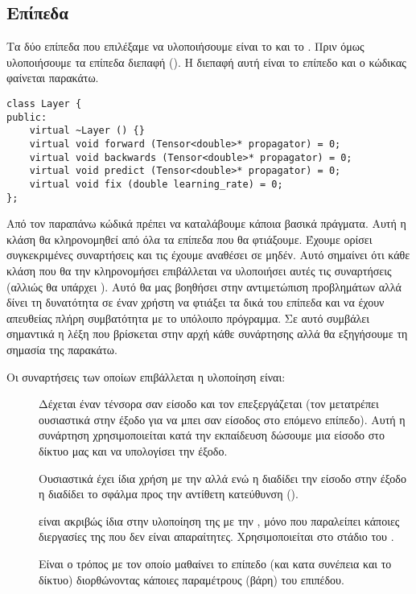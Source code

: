 \subsection{Επίπεδα}
Τα δύο επίπεδα που επιλέξαμε να υλοποιήσουμε είναι το  και το . Πριν όμως υλοποιήσουμε τα επίπεδα διεπαφή (). Η διεπαφή αυτή είναι το επίπεδο και ο κώδικας φαίνεται
παρακάτω.
\begin{otherlanguage}{english}
\begin{lstlisting}[style=cppstyle,caption=Layer Interface]
class Layer {
public:
    virtual ~Layer () {}
    virtual void forward (Tensor<double>* propagator) = 0;
    virtual void backwards (Tensor<double>* propagator) = 0;
    virtual void predict (Tensor<double>* propagator) = 0;
    virtual void fix (double learning_rate) = 0;
};
\end{lstlisting}
\end{otherlanguage}
Από τον παραπάνω κώδικά πρέπει να καταλάβουμε κάποια βασικά πράγματα. Αυτή η κλάση θα κληρονομηθεί από όλα τα επίπεδα που θα φτιάξουμε. Έχουμε ορίσει συγκεκριμένες συναρτήσεις και τις έχουμε αναθέσει σε μηδέν. Αυτό σημαίνει ότι κάθε κλάση
που θα την κληρονομήσει επιβάλλεται να υλοποιήσει αυτές τις συναρτήσεις (αλλιώς θα υπάρχει ). Αυτό θα μας βοηθήσει στην αντιμετώπιση προβλημάτων αλλά δίνει τη δυνατότητα σε έναν χρήστη να φτιάξει τα δικά του επίπεδα και να έχουν
απευθείας πλήρη συμβατότητα με το υπόλοιπο πρόγραμμα. Σε αυτό συμβάλει σημαντικά η λέξη  που βρίσκεται στην αρχή κάθε συνάρτησης αλλά θα εξηγήσουμε τη σημασία της παρακάτω.

Οι συναρτήσεις των οποίων επιβάλλεται η υλοποίηση είναι:
\begin{description}
    \item[] Δέχεται έναν τένσορα σαν  είσοδο και τον επεξεργάζεται (τον μετατρέπει ουσιαστικά στην έξοδο για να μπει σαν είσοδος στο επόμενο επίπεδο). Αυτή η συνάρτηση χρησιμοποιείται κατά την εκπαίδευση δώσουμε μια είσοδο στο
    δίκτυο μας και να υπολογίσει την έξοδο.
    \item[] Ουσιαστικά έχει ίδια χρήση με την  αλλά ενώ η  διαδίδει την είσοδο στην έξοδο η  διαδίδει το σφάλμα προς την αντίθετη κατεύθυνση ().
    \item[] είναι ακριβώς ίδια στην υλοποίηση της με την , μόνο που παραλείπει κάποιες διεργασίες της που δεν είναι απαραίτητες. Χρησιμοποιείται στο στάδιο του .
    \item[] Είναι ο τρόπος με τον οποίο μαθαίνει το επίπεδο (και κατα συνέπεια και το δίκτυο) διορθώνοντας κάποιες παραμέτρους (βάρη) του επιπέδου.
\end{description}


